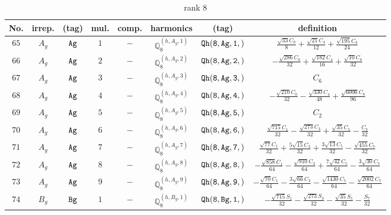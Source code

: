 \documentclass[fleqn,8pt]{jsarticle}
\begin{document}
\begin{table}[ht!]
\begin{center}
\caption{rank 8}
\renewcommand{\arraystretch}{1.3}
\begin{tabular}{cccccccc} \hline \hline
No. & irrep. & (tag) & mul. & comp. & harmonics & (tag) & definition \\ \hline
$ 65 $ & $ A_{g} $ & $ {\tt Ag} $ & $ 1 $ & $ - $ & $ \mathbb{Q}_{8}^{(h,A_{g},1)} $ & $ {\tt Qh(8,Ag,1,)} $ & $ \frac{\sqrt{33} C_{0}}{8} + \frac{\sqrt{21} C_{4}}{12} + \frac{\sqrt{195} C_{8}}{24} $ \\
$ 66 $ & $ A_{g} $ & $ {\tt Ag} $ & $ 2 $ & $ - $ & $ \mathbb{Q}_{8}^{(h,A_{g},2)} $ & $ {\tt Qh(8,Ag,2,)} $ & $ - \frac{\sqrt{286} C_{0}}{32} + \frac{\sqrt{182} C_{4}}{16} + \frac{\sqrt{10} C_{8}}{32} $ \\
$ 67 $ & $ A_{g} $ & $ {\tt Ag} $ & $ 3 $ & $ - $ & $ \mathbb{Q}_{8}^{(h,A_{g},3)} $ & $ {\tt Qh(8,Ag,3,)} $ & $ C_{6} $ \\
$ 68 $ & $ A_{g} $ & $ {\tt Ag} $ & $ 4 $ & $ - $ & $ \mathbb{Q}_{8}^{(h,A_{g},4)} $ & $ {\tt Qh(8,Ag,4,)} $ & $ - \frac{\sqrt{210} C_{0}}{32} - \frac{\sqrt{330} C_{4}}{48} + \frac{\sqrt{6006} C_{8}}{96} $ \\
$ 69 $ & $ A_{g} $ & $ {\tt Ag} $ & $ 5 $ & $ - $ & $ \mathbb{Q}_{8}^{(h,A_{g},5)} $ & $ {\tt Qh(8,Ag,5,)} $ & $ C_{2} $ \\
$ 70 $ & $ A_{g} $ & $ {\tt Ag} $ & $ 6 $ & $ - $ & $ \mathbb{Q}_{8}^{(h,A_{g},6)} $ & $ {\tt Qh(8,Ag,6,)} $ & $ \frac{\sqrt{715} C_{1}}{32} - \frac{\sqrt{273} C_{3}}{32} + \frac{\sqrt{35} C_{5}}{32} - \frac{C_{7}}{32} $ \\
$ 71 $ & $ A_{g} $ & $ {\tt Ag} $ & $ 7 $ & $ - $ & $ \mathbb{Q}_{8}^{(h,A_{g},7)} $ & $ {\tt Qh(8,Ag,7,)} $ & $ \frac{\sqrt{77} C_{1}}{32} + \frac{5 \sqrt{15} C_{3}}{32} + \frac{3 \sqrt{13} C_{5}}{32} - \frac{\sqrt{455} C_{7}}{32} $ \\
$ 72 $ & $ A_{g} $ & $ {\tt Ag} $ & $ 8 $ & $ - $ & $ \mathbb{Q}_{8}^{(h,A_{g},8)} $ & $ {\tt Qh(8,Ag,8,)} $ & $ - \frac{\sqrt{858} C_{1}}{64} - \frac{\sqrt{910} C_{3}}{64} + \frac{7 \sqrt{42} C_{5}}{64} - \frac{3 \sqrt{30} C_{7}}{64} $ \\
$ 73 $ & $ A_{g} $ & $ {\tt Ag} $ & $ 9 $ & $ - $ & $ \mathbb{Q}_{8}^{(h,A_{g},9)} $ & $ {\tt Qh(8,Ag,9,)} $ & $ - \frac{\sqrt{70} C_{1}}{64} - \frac{3 \sqrt{66} C_{3}}{64} - \frac{\sqrt{1430} C_{5}}{64} - \frac{\sqrt{2002} C_{7}}{64} $ \\
$ 74 $ & $ B_{g} $ & $ {\tt Bg} $ & $ 1 $ & $ - $ & $ \mathbb{Q}_{8}^{(h,B_{g},1)} $ & $ {\tt Qh(8,Bg,1,)} $ & $ - \frac{\sqrt{715} S_{1}}{32} - \frac{\sqrt{273} S_{3}}{32} - \frac{\sqrt{35} S_{5}}{32} - \frac{S_{7}}{32} $ \\

\end{tabular}
\end{center}
\end{table}
\end{document}
